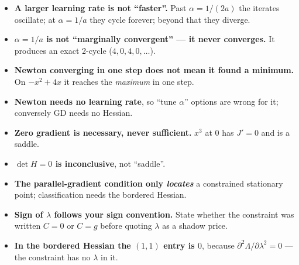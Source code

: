 \begin{trapbox}
\begin{itemize}
\item \textbf{A larger learning rate is not ``faster''.} Past $\alpha = 1/(2a)$ the iterates oscillate; at $\alpha = 1/a$ they cycle forever; beyond that they diverge.
\item \textbf{$\alpha = 1/a$ is not ``marginally convergent'' --- it never converges.} It produces an exact 2-cycle ($4,0,4,0,\dots$).
\item \textbf{Newton converging in one step does not mean it found a minimum.} On $-x^2+4x$ it reaches the \emph{maximum} in one step.
\item \textbf{Newton needs no learning rate}, so ``tune $\alpha$'' options are wrong for it; conversely GD needs no Hessian.
\item \textbf{Zero gradient is necessary, never sufficient.} $x^3$ at $0$ has $J'=0$ and is a saddle.
\item \textbf{$\det H = 0$ is inconclusive}, not ``saddle''.
\item \textbf{The parallel-gradient condition only \emph{locates}} a constrained stationary point; classification needs the bordered Hessian.
\item \textbf{Sign of $\lambda$ follows your sign convention.} State whether the constraint was written $C=0$ or $C=g$ before quoting $\lambda$ as a shadow price.
\item \textbf{In the bordered Hessian the $(1,1)$ entry is $0$}, because $\partial^2\Lambda/\partial\lambda^2 = 0$ --- the constraint has no $\lambda$ in it.
\end{itemize}
\end{trapbox}

